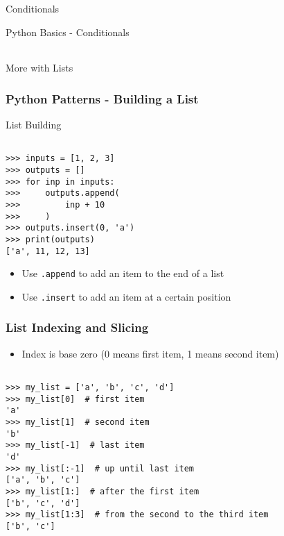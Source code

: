 \documentclass[handout, 11pt]{beamer}
\begin{document}
\begin{section}{Conditionals}
\begin{frame}
{\begin{block}{Python Basics - Conditionals}
\begin{tabular*}{\textwidth}{@{\extracolsep{\fill}}ccc}
\end{tabular*}
\end{block}
}
\label{labs:python-conditionals-lab-1}
\end{frame}
\end{section}
\begin{section}[Lists]{More with Lists}
\begin{frame}[fragile]
\frametitle{Python Patterns - Building a List}
\begin{block}{List Building}
\begin{verbatim}

>>> inputs = [1, 2, 3]
>>> outputs = []
>>> for inp in inputs:
>>>     outputs.append(
>>>         inp + 10
>>>     )
>>> outputs.insert(0, 'a')
>>> print(outputs)
['a', 11, 12, 13]

\end{verbatim}
\end{block}
\begin{itemize}
\item Use 
\texttt{.append}
 to add an item to the end of a list
\item Use 
\texttt{.insert}
 to add an item at a certain position
\end{itemize}
\end{frame}
\begin{frame}[fragile]
\frametitle{List Indexing and Slicing}
\begin{itemize}
\item Index is base zero (0 means first item, 1 means second item)
\end{itemize}
\vfill
\begin{verbatim}

>>> my_list = ['a', 'b', 'c', 'd']
>>> my_list[0]  # first item
'a'
>>> my_list[1]  # second item
'b'
>>> my_list[-1]  # last item
'd'
>>> my_list[:-1]  # up until last item
['a', 'b', 'c']
>>> my_list[1:]  # after the first item
['b', 'c', 'd']
>>> my_list[1:3]  # from the second to the third item
['b', 'c']


\end{verbatim}
\end{frame}
\end{section}
\end{document}
